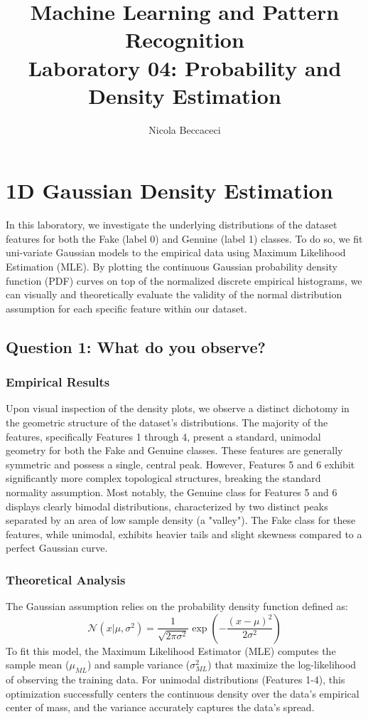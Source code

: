 \documentclass[12pt, a4paper]{article}
\title{Machine Learning and Pattern Recognition\\ \large Laboratory 04: Probability and Density Estimation}
\author{Nicola Beccaceci}
\date{}
\begin{document}
\maketitle

\section*{1D Gaussian Density Estimation}

In this laboratory, we investigate the underlying distributions of the dataset features for both the Fake (label 0) and Genuine (label 1) classes. To do so, we fit uni-variate Gaussian models to the empirical data using Maximum Likelihood Estimation (MLE). By plotting the continuous Gaussian probability density function (PDF) curves on top of the normalized discrete empirical histograms, we can visually and theoretically evaluate the validity of the normal distribution assumption for each specific feature within our dataset.

\subsection*{Question 1: What do you observe?}

\subsubsection*{Empirical Results}
Upon visual inspection of the density plots, we observe a distinct dichotomy in the geometric structure of the dataset's distributions. The majority of the features, specifically Features 1 through 4, present a standard, unimodal geometry for both the Fake and Genuine classes. These features are generally symmetric and possess a single, central peak. However, Features 5 and 6 exhibit significantly more complex topological structures, breaking the standard normality assumption. Most notably, the Genuine class for Features 5 and 6 displays clearly bimodal distributions, characterized by two distinct peaks separated by an area of low sample density (a "valley"). The Fake class for these features, while unimodal, exhibits heavier tails and slight skewness compared to a perfect Gaussian curve.

\subsubsection*{Theoretical Analysis}
The Gaussian assumption relies on the probability density function defined as:
\[
\mathcal{N}(x | \mu, \sigma^2) = \frac{1}{\sqrt{2\pi\sigma^2}} \exp\left( -\frac{(x - \mu)^2}{2\sigma^2} \right)
\]
To fit this model, the Maximum Likelihood Estimator (MLE) computes the sample mean ($\mu_{ML}$) and sample variance ($\sigma^2_{ML}$) that maximize the log-likelihood of observing the training data. For unimodal distributions (Features 1-4), this optimization successfully centers the continuous density over the data's empirical center of mass, and the variance accurately captures the data's spread. 
\end{document}

